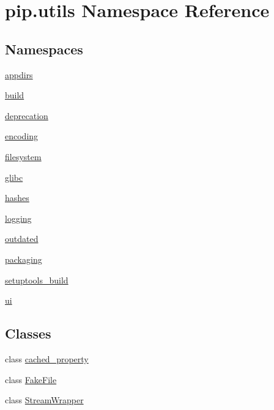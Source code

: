 \hypertarget{namespacepip_1_1utils}{}\section{pip.\+utils Namespace Reference}
\label{namespacepip_1_1utils}
\subsection*{Namespaces}
\begin{DoxyCompactItemize}
\item 
 \hyperlink{namespacepip_1_1utils_1_1appdirs}{appdirs}
\item 
 \hyperlink{namespacepip_1_1utils_1_1build}{build}
\item 
 \hyperlink{namespacepip_1_1utils_1_1deprecation}{deprecation}
\item 
 \hyperlink{namespacepip_1_1utils_1_1encoding}{encoding}
\item 
 \hyperlink{namespacepip_1_1utils_1_1filesystem}{filesystem}
\item 
 \hyperlink{namespacepip_1_1utils_1_1glibc}{glibc}
\item 
 \hyperlink{namespacepip_1_1utils_1_1hashes}{hashes}
\item 
 \hyperlink{namespacepip_1_1utils_1_1logging}{logging}
\item 
 \hyperlink{namespacepip_1_1utils_1_1outdated}{outdated}
\item 
 \hyperlink{namespacepip_1_1utils_1_1packaging}{packaging}
\item 
 \hyperlink{namespacepip_1_1utils_1_1setuptools__build}{setuptools\+\_\+build}
\item 
 \hyperlink{namespacepip_1_1utils_1_1ui}{ui}
\end{DoxyCompactItemize}
\subsection*{Classes}
\begin{DoxyCompactItemize}
\item 
class \hyperlink{classpip_1_1utils_1_1cached__property}{cached\+\_\+property}
\item 
class \hyperlink{classpip_1_1utils_1_1_fake_file}{Fake\+File}
\item 
class \hyperlink{classpip_1_1utils_1_1_stream_wrapper}{Stream\+Wrapper}
\end{DoxyCompactItemize}
